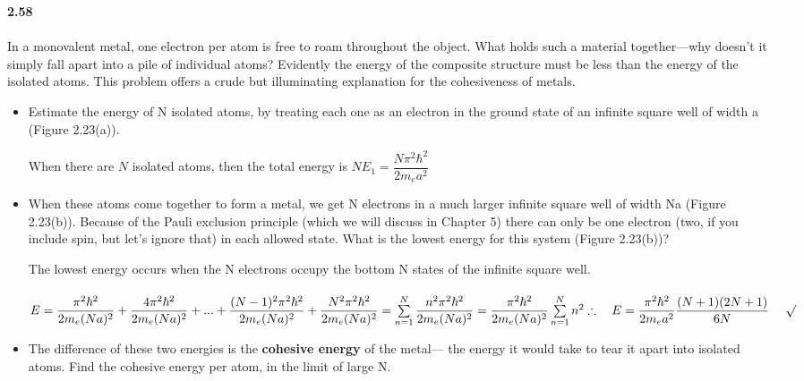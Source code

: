 \documentclass[fleqn]{article}
\begin{document}
  \textbf{2.58} \\ \\
  In a monovalent metal, one electron per atom is free to roam
  throughout the object. What holds such a material together—why doesn’t it
  simply fall apart into a pile of individual atoms? Evidently the energy of the
  composite structure must be less than the energy of the isolated atoms. This
  problem offers a crude but illuminating explanation for the cohesiveness of
  metals.
  \begin{itemize}
    \item Estimate the energy of N isolated atoms, by treating each one as an
    electron in the ground state of an infinite square well of width a
    (Figure 2.23(a)).

      \textcolor{hwColor}{
        When there are $N$ isolated atoms, then the total energy is $N E_1=\dfrac{N \pi^2 \hbar^2}{2m_e a^2}$
      }
      
    \item When these atoms come together to form a metal, we get N electrons in a
    much larger infinite square well of width Na (Figure 2.23(b)). Because of
    the Pauli exclusion principle (which we will discuss in Chapter 5) there
    can only be one electron (two, if you include spin, but let’s ignore that) in
    each allowed state. What is the lowest energy for this system
    (Figure 2.23(b))?

      \textcolor{hwColor}{
        The lowest energy occurs when the N electrons occupy the bottom N states of the infinite square well. \\ \\
        $
          E=\dfrac{\pi^2 \hbar^2}{2 m_e(Na)^2}+\dfrac{4 \pi^2 \hbar^2}{2 m_e(Na)^2}+...+\dfrac{(N-1)^2\pi^2 \hbar^2}{2 m_e(Na)^2}+\dfrac{N^2\pi^2 \hbar^2}{2 m_e(Na)^2}
          =\sum\limits_{n=1}^{N} \dfrac{n^2 \pi^2 \hbar^2}{2 m_e(Na)^2}
          \\
          \\
          =\dfrac{\pi^2 \hbar^2}{2 m_e(Na)^2} \sum\limits_{n=1}^{N} n^2 \\
          \\
          \\
          \\
          \therefore ~~~ E=\dfrac{\pi^2 \hbar^2}{2m_e a^2} \dfrac{(N+1)(2N+1)}{6N} ~~~~ \surd
        $
      }

    \item The difference of these two energies is the \textbf{cohesive energy} of the metal—
    the energy it would take to tear it apart into isolated atoms. Find the
    cohesive energy per atom, in the limit of large N.


\end{itemize}
\end{document}
